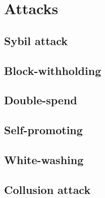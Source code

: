\chapter{Attacks}

\section{Sybil attack}

\section{Block-withholding}

\section{Double-spend}

\section{Self-promoting}

\section{White-washing}

\section{Collusion attack}
